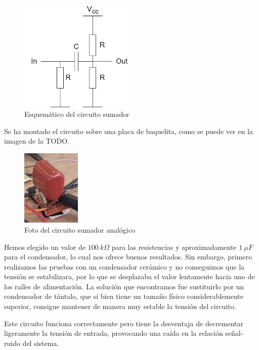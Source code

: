 \begin{figure}[h]
    \centering
    \includegraphics[width=0.5\textwidth]{images/2/2-6/sumadorEsquematico.png}
    \caption{Esquemático del circuito sumador}
    \label{fig:2-6-sumador}
\end{figure}

Se ha montado el circuito sobre una placa de baquelita, como se puede ver en la imagen de la TODO.\ 

\begin{figure}[h]
    \centering
    \includegraphics[width=0.25\textwidth]{images/2/2-6/fotoSumador.jpg}
    \caption{Foto del circuito sumador analógico}
    \label{fig:2-6-foto-sumador}
\end{figure}

Hemos elegido un valor de $100\ k\Omega$ para las resistencias y aproximadamente $1\ \mu F$ para el condensador, lo cual nos ofrece buenos resultados. Sin embargo, primero realizamos las pruebas con un condensador cerámico y no conseguimos que la tensión se estabilizara, por lo que se desplazaba el valor lentamente hacia uno de los raíles de alimentación. La solución que encontramos fue sustituirlo por un condensador de tántalo, que si bien tiene un tamaño físico considerablemente superior, consigue mantener de manera muy estable la tensión del circuito.

Este circuito funciona correctamente pero tiene la desventaja de decrementar ligeramente la tensión de entrada, provocando una caída en la relación señal-ruido del sistema.

